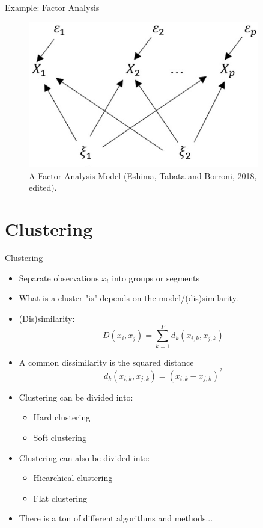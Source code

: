 \documentclass[10pt]{beamer}
\begin{document}
\begin{frame}{Example: Factor Analysis}

\begin{figure}[h]
\centering
\includegraphics[width=0.9\textwidth]{fig/FM.png}
\caption{A Factor Analysis Model (Eshima, Tabata and Borroni, 2018, edited).}
\end{figure}

\end{frame}



\section{Clustering}


\begin{frame}{Clustering}
\begin{itemize}
\item Separate observations $x_i$ into {\color{uured} groups} or {\color{uured} segments}\pause
\item What is a cluster "is" depends on the {\color{uured} model/(dis)similarity}.
\item (Dis)similarity:
\[
D(x_i, x_j) = \sum_{k = 1}^P d_k(x_{i,k}, x_{j,k})
\]
\item A common dissimilarity is the squared distance
\[
d_k(x_{i,k}, x_{j,k}) = (x_{i,k} - x_{j,k})^2
\]
\pause
\item Clustering can be divided into:
\begin{itemize}
\item {\color{uured} Hard} clustering%
\item {\color{uured} Soft} clustering%
\end{itemize}
\pause
\item Clustering can also be divided into:
\begin{itemize}
\item {\color{uured} Hiearchical} clustering
\item {\color{uured} Flat} clustering
\end{itemize}
\pause
\item There is a ton of different algorithms and methods...
\end{itemize}

\end{frame}
\end{document}
